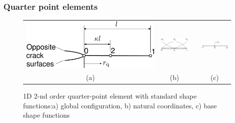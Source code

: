 \documentclass[11pt]{acmeArticle}
\numberwithin{equation}{section}
\begin{document}
\subsubsection{Quarter point elements} %
\begin{figure}[h!]
\begin{center}
\begin{tabular}{c c c c}
\includegraphics[height=2.cm]{Figures/QuarterPoint.pdf}  & \includegraphics[height=2.1cm]{Figures/2ndOrderNodeOr.pdf} &   &  \includegraphics[height=1.3cm]{Figures/StandardElement.pdf}\\  
 (a) & (b)& &(c)
\end{tabular}
\caption{1D 2-nd order quarter-point element with standard shape functions:a) global configuration, b) natural coordinates, c) base shape functions }
\label{fig:1d-quarter}
\end{center}
\end{figure}
\end{document}
